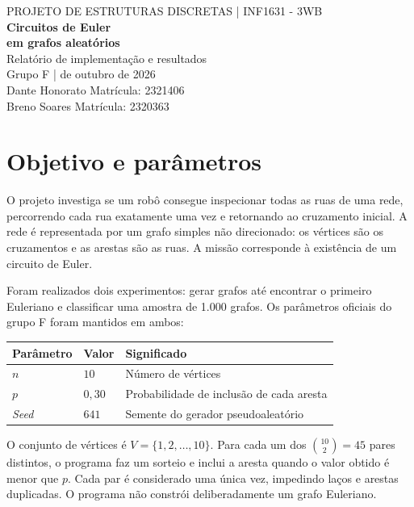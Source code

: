\documentclass[11pt,a4paper]{article}
\begin{document}
\begin{center}
  {\small\textcolor{cinza}{PROJETO DE ESTRUTURAS DISCRETAS | INF1631 - 3WB}}\\[10pt]
  {\LARGE\bfseries\textcolor{azul}{Circuitos de Euler\\[3pt]em grafos aleatórios}}\\[8pt]
  {\large Relatório de implementação e resultados}\\[6pt]
  {Grupo F \quad |  de outubro de 2026}\\[9pt]
  {Dante Honorato \quad Matrícula: 2321406}\\[2pt]
  {Breno Soares \quad Matrícula: 2320363}
\end{center}
\vspace{4pt}

\section{Objetivo e parâmetros}

O projeto investiga se um robô consegue inspecionar todas as ruas de uma rede,
percorrendo cada rua exatamente uma vez e retornando ao cruzamento inicial.
A rede é representada por um grafo simples não direcionado: os vértices são
os cruzamentos e as arestas são as ruas. A missão corresponde à existência
de um circuito de Euler.

Foram realizados dois experimentos: gerar grafos até encontrar o primeiro
Euleriano e classificar uma amostra de 1.000 grafos. Os parâmetros oficiais
do grupo F foram mantidos em ambos:

\begin{center}
\begin{tabular}{lll}
\toprule
Parâmetro & Valor & Significado \\
\midrule
$n$ & $10$ & Número de vértices \\
$p$ & $0{,}30$ & Probabilidade de inclusão de cada aresta \\
\textit{Seed} & $641$ & Semente do gerador pseudoaleatório \\
\bottomrule
\end{tabular}
\end{center}

O conjunto de vértices é $V=\{1,2,\ldots,10\}$. Para cada um dos
$\binom{10}{2}=45$ pares distintos, o programa faz um sorteio e inclui a
aresta quando o valor obtido é menor que $p$. Cada par é considerado uma
única vez, impedindo laços e arestas duplicadas. O programa não constrói
deliberadamente um grafo Euleriano.
\end{document}
